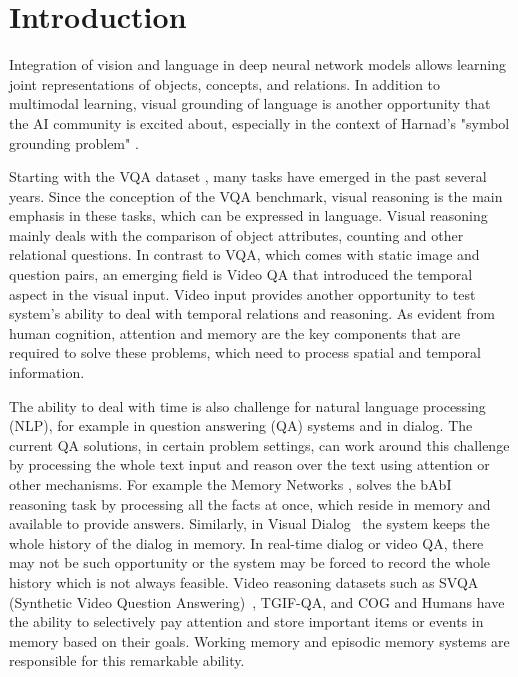 \section{Introduction}

Integration of vision and language in deep neural network models allows learning joint representations of objects, concepts, and relations.  In addition to multimodal learning, visual grounding of language is another opportunity that the AI community is excited about, especially in the context of Harnad's "symbol grounding problem" \cite{}. 

Starting with the VQA dataset \cite{}, many tasks have emerged in the past several years\cite{mogadala2019trends}.  Since the conception of the VQA benchmark, visual reasoning is the main emphasis in these tasks, which can be expressed in language. Visual reasoning mainly deals with the comparison of object attributes, counting and other relational questions.
In contrast to VQA, which comes with static image and question pairs, an emerging field is Video QA \cite{} that introduced the temporal aspect in the visual input.  Video input provides another opportunity to test system's ability to deal with temporal relations and reasoning.  As evident from human cognition, attention and memory are the key components that are required to solve these problems, which need to process spatial and temporal information.

The ability to deal with time is also challenge for natural language processing (NLP), for example in question answering (QA) systems and in dialog.  The current QA solutions, in certain problem settings, can work around this challenge by processing the whole text input and reason over the text using attention or other mechanisms. For example the Memory Networks \cite{weston2015towards}, solves the bAbI reasoning task by processing all the facts at once, which reside in memory and available to provide answers. Similarly, in Visual Dialog~\cite{das2017visual} the system keeps the whole history of the dialog in memory.  In real-time dialog or video QA, there may not be such opportunity or the system may be forced to record the whole history which is not always feasible.  Video reasoning datasets such as SVQA (Synthetic Video Question Answering)~\cite{song2018explore}, TGIF-QA, and COG \cite{yang2018dataset} 
and 
Humans have the ability to selectively pay attention and store important items or events in memory based on their goals.  Working memory and episodic memory systems are responsible for this remarkable ability. 

